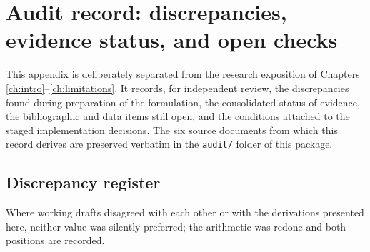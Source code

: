 \chapter{Audit record: discrepancies, evidence status, and open checks}
\label{app:audit}

This appendix is deliberately separated from the research exposition of Chapters
\ref{ch:intro}--\ref{ch:limitations}. It records, for independent review, the discrepancies found
during preparation of the formulation, the consolidated status of evidence, the bibliographic and
data items still open, and the conditions attached to the staged implementation decisions. The six
source documents from which this record derives are preserved verbatim in the \texttt{audit/}
folder of this package.

\section{Discrepancy register}
Where working drafts disagreed with each other or with the derivations presented here, neither
value was silently preferred; the arithmetic was redone and both positions are recorded.


